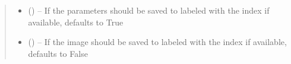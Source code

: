 \documentclass[letterpaper,10pt,english]{sphinxmanual}
\begin{document}
\begin{fulllineitems}
\begin{fulllineitems}
\begin{quote}
\begin{description}
\begin{itemize}
\item {} 
 (\sphinxstyleliteralemphasis{\sphinxupquote{, }}) -- If the parameters should be saved to  labeled with the index if available, defaults to True

\item {} 
 (\sphinxstyleliteralemphasis{\sphinxupquote{, }}) -- If the image should be saved to  labeled with the index if available, defaults to False

\end{itemize}

\end{description}\end{quote}

\end{fulllineitems}



\end{fulllineitems}
\end{document}
